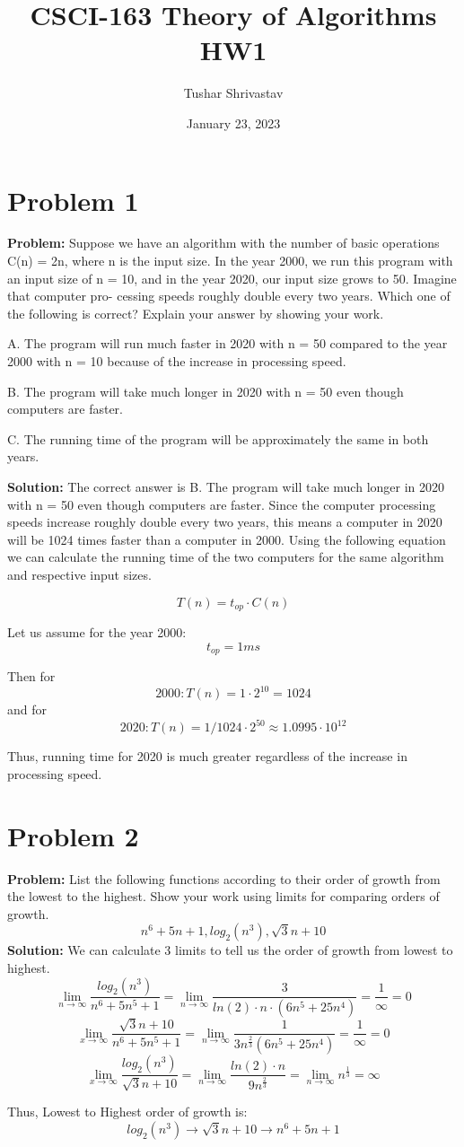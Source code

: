 \documentclass{article}
\title{CSCI-163 Theory of Algorithms HW1}
\author{Tushar Shrivastav}
\date{January 23, 2023}
\begin{document}
\maketitle

\section{Problem 1}
\textbf{Problem:} 
Suppose we have an algorithm with the number of basic operations C(n) = 2n,
where n is the input size. In the year 2000, we run this program with an input size of
n = 10, and in the year 2020, our input size grows to 50. Imagine that computer pro-
cessing speeds roughly double every two years. Which one of the following is correct?
Explain your answer by showing your work.

A. The program will run much faster in 2020 with n = 50 compared to the year 2000
with n = 10 because of the increase in processing speed.

B. The program will take much longer in 2020 with n = 50 even though computers
are faster.

C. The running time of the program will be approximately the same in both years.

\textbf{Solution:}
The correct answer is B. The program will take much longer in 2020 with n = 50 even though computers are faster. Since the computer processing speeds increase roughly double every two years, this means a computer in 2020 will be 1024 times faster than a computer in 2000. Using the following equation we can calculate the running time of the two computers for the same algorithm and respective input sizes.

\begin{equation}
    T(n) = t_{op} \cdot C(n)
\end{equation}

Let us assume for the year 2000: \[t_{op} = 1 ms\] 

Then for  \[2000: T(n) = 1 \cdot 2^10 = 1024\] and for \[2020: T(n) = 1/1024 \cdot 2^50 \approx 1.0995 \cdot 10^{12}\]

Thus, running time for 2020 is much greater regardless of the increase in processing speed.

\section{Problem 2}
\textbf{Problem:} List the following functions according to their order of growth from the lowest
to the highest. Show your work using limits for comparing orders of growth.
\[n^6 +5n +1, log_2(n^3), \sqrt{3}{n} + 10\]
\textbf{Solution: }
We can calculate 3 limits to tell us the order of growth from lowest to highest.
\[ \lim_{n\to\infty} \frac{log_2(n^3)}{n^6+5n^5+1} = \lim_{n\to\infty} \frac{3}{ln(2)\cdot n \cdot (6n^5 +25n^4)} = \frac{1}{\infty} = 0\]
\[ \lim_{x\to\infty} \frac{\sqrt{3}{n}+10}{n^6+5n^5+1} = \lim_{n\to\infty} \frac{1}{3n^{\frac{2}{3}}(6n^5 +25n^4)} = \frac{1}{\infty} = 0 \]
\[ \lim_{x\to\infty} \frac{log_2(n^3)}{\sqrt{3}{n}+10} = \lim_{n\to\infty} \frac{ln(2)\cdot n}{9n^{\frac{2}{3}}} = \lim_{n\to\infty} n^{\frac{1}{3}} = \infty\]

Thus, Lowest to Highest order of growth is: \[log_2(n^3) \to \sqrt{3}{n} + 10 \to n^6 +5n +1\]
\end{document}
